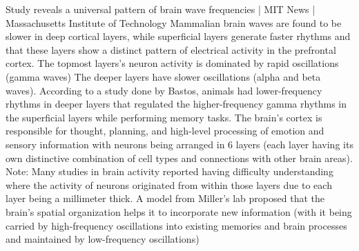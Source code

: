 Study reveals a universal pattern of brain wave frequencies | MIT News | Massachusetts Institute of Technology
Mammalian brain waves are found to be slower in deep cortical layers, while superficial layers generate faster rhythms and that these layers show a distinct pattern of electrical activity in the prefrontal cortex.
The topmost layers’s neuron activity is dominated by rapid oscillations (gamma waves)
The deeper layers have slower oscillations (alpha and beta waves).
According to a study done by Bastos, animals had lower-frequency rhythms in deeper layers that regulated the higher-frequency gamma rhythms in the superficial layers while performing memory tasks.
The brain’s cortex is responsible for thought, planning, and high-level processing of emotion and sensory information with neurons being arranged in 6 layers (each layer having its own distinctive combination of cell types and connections with other brain areas).
Note: Many studies in brain activity reported having difficulty understanding where the activity of neurons originated from within those layers due to each layer being a millimeter thick.
A model from Miller’s lab proposed that the brain’s spatial organization helps it to incorporate new information (with it being carried by high-frequency oscillations into existing memories and brain processes and maintained by low-frequency oscillations)